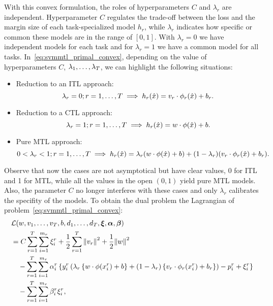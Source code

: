With this convex formulation, the roles of hyperparameters $C$ and $\lambda_r$ are independent. Hyperparameter $C$ regulates the trade-off between the loss and the margin size of each task-specialized model $h_r$, while $\lambda_r$ indicates how specific or common these models are in the range of $[0, 1]$. With $\lambda_r=0$ we have independent models for each task and for $\lambda_r=1$ we have a common model for all tasks. 
%
In~\eqref{eq:svmmtl_primal_convex}, depending on the value of hyperparameters $C$, $\lambda_1, \ldots, \lambda_T$, we can highlight the following situations:
%
\begin{itemize}
    \item Reduction to an ITL approach:
    $$\lambda_r = 0 ; r=1, \ldots, T \implies h_r(\hat{x}) = {v}_r \cdot \phi_r(\hat{x}) + b_r .$$
    \item Reduction to a CTL approach: 
    $$ \lambda_r = 1 ; r=1, \ldots, T \implies h_r(\hat{x}) = {w} \cdot \phi(\hat{x}) + b .$$
    \item Pure MTL approach:
    $$ 0 < \lambda_r < 1 ; r=1, \ldots, T \implies h_r(\hat{x}) = \lambda_r ({w} \cdot \phi(\hat{x}) + b ) + (1 - \lambda_r) ({v}_r \cdot \phi_r(\hat{x}) + b_r) .$$
\end{itemize}
Observe that now the cases are not asymptotical but have clear values, 0 for ITL and 1 for MTL, while all the values in the open $(0, 1)$ yield pure MTL models. Also, the parameter $C$ no longer interferes with these cases and only $\lambda_r$ calibrates the specifity of the models.
 To obtain the dual problem the Lagrangian of problem~\eqref{eq:svmmtl_primal_convex}:
\begin{equation}\label{eq:svmmtl_lagrangian_convex}
    \begin{aligned}
        & \lagr({w}, {v}_1, \ldots, {v}_\ntasks, b, d_1, \ldots, d_\ntasks, \fv{\xi}, \fv{\alpha}, \fv{\beta}) \\
        &=  C \sum_{r= 1}^T \sum_{i=1}^{m_r} {\xi_{i}^r} + \frac{1}{2} \sum_{r= 1}^T{\norm{{v}_r}^2} + \frac{1}{2} {\norm{{w}}}^2 \\
        &\quad -  \sum_{r= 1}^T \sum_{i=1}^{m_r} \alpha_i^r \left\lbrace y_{i}^r  \left(\lambda_r \left\lbrace {w} \cdot \phi(x_{i}^r) + b  \right\rbrace + (1 - \lambda_r) \left\lbrace {v}_r \cdot \phi_r(x_{i}^r) + b_r \right\rbrace  \right) - p_{i}^r + \xi_{i}^r  \right\rbrace \\
        &\quad -  \sum_{r= 1}^T \sum_{i=1}^{m_r} \beta_i^r \xi_i^r ,
    \end{aligned}
\end{equation}
